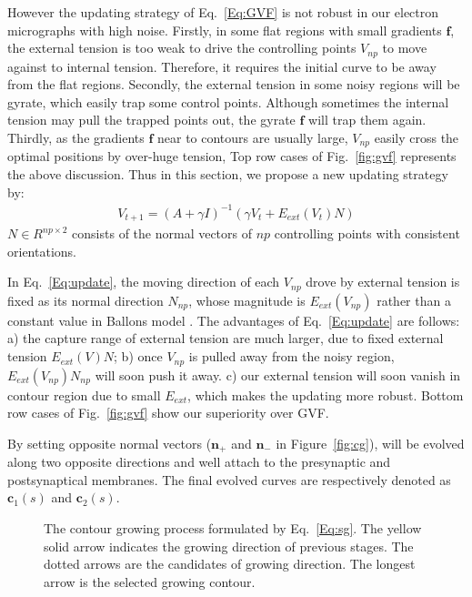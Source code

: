 However the updating strategy of Eq.~\ref{Eq:GVF} is not robust in our electron micrographs with high noise.
Firstly, in some flat regions with small gradients $\mathbf{f}$, the external tension is too weak to drive the controlling points $V_{np}$ to move against to internal tension.
Therefore, it requires the initial curve to be away from the flat regions.
Secondly, the external tension in some noisy regions will be gyrate, which easily trap some control points.
Although sometimes the internal tension may pull the trapped points out, the gyrate $\mathbf{f}$ will trap them again.
Thirdly, as the gradients $\mathbf{f}$ near to contours are usually large, $V_{np}$ easily cross the optimal positions by over-huge tension,
Top row cases of Fig.~\ref{fig:gvf} represents the above discussion.
Thus in this section, we propose a new updating strategy by:
\begin{eqnarray}\label{Eq:update}
V_{t+1} = (A+\gamma I)^{-1}(\gamma V_t+E_{ext}(V_t)N)
\end{eqnarray}
$N\in R^{np\times2}$ consists of the normal vectors of $np$ controlling points with consistent orientations.

In Eq.~\ref{Eq:update}, the moving direction of each $V_{np}$ drove by external tension is fixed as its normal direction $N_{np}$, whose magnitude is $E_{ext}(V_{np})$ rather than a constant value in Ballons model \cite{Cohen1991}.
The advantages of Eq.~\ref{Eq:update} are follows:
a) the capture range of external tension are much larger, due to fixed external tension $E_{ext}(V)N$;
b) once $V_{np}$ is pulled away from the noisy region, $E_{ext}(V_{np})N_{np}$ will soon push it away.
c) our external tension will soon vanish in contour region due to small $E_{ext}$, which makes the updating more robust.
Bottom row cases of Fig.~\ref{fig:gvf} show our superiority over GVF.

By setting  opposite normal vectors ($\mathbf{n}_{+}$ and $\mathbf{n}_{-}$ in Figure~\ref{fig:cg}),  will be evolved along two opposite directions and well attach to the presynaptic and postsynaptical membranes.
The final evolved curves are respectively denoted as $\mathbf{c}_1(s)$ and $\mathbf{c}_2(s)$.

\begin{figure}[t]
\begin{minipage}[b]{1.0\linewidth}
  \centering
 \centerline{}
\end{minipage}
\caption{The contour growing process formulated by Eq.~\ref{Eq:sg}.
        The yellow solid arrow indicates the growing direction of previous stages. The dotted arrows are the candidates of growing direction. The longest arrow is the selected growing contour.}
\label{fig:g}
\end{figure}

